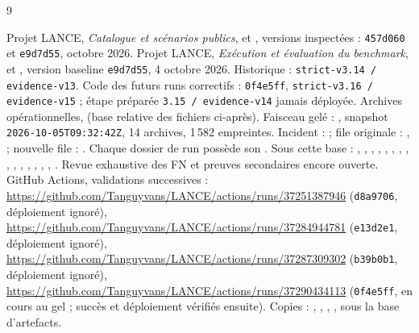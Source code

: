 \documentclass[11pt,a4paper]{article}
\newcommand{\code}[1]{{\urlstyle{tt}\nolinkurl{#1}}}
\begin{document}
{\small
\begin{thebibliography}{9}
\raggedright
\setlength{\itemsep}{1pt}
\setlength{\parskip}{0pt}
 Projet LANCE, \emph{Catalogue et scénarios publics},  et , versions inspectées : \code{457d060} et \code{e9d7d55}, octobre 2026.
 Projet LANCE, \emph{Exécution et évaluation du benchmark},  et , version baseline \code{e9d7d55}, 4 octobre 2026. Historique : \code{strict-v3.14 / evidence-v13}. Code des futurs runs correctifs : \code{0f4e5ff}, \code{strict-v3.16 / evidence-v15} ; étape préparée \code{3.15 / evidence-v14} jamais déployée.
 Archives opérationnelles,  (base relative des fichiers ci-après). Faisceau gelé : , snapshot \code{2026-10-05T09:32:42Z}, 14 archives, 1\,582 empreintes. Incident :  ; file originale : ,  ; nouvelle file : . Chaque dossier de run possède son .
 Sous cette base : , , , , , , , , , , , , , , , . Revue exhaustive des FN et preuves secondaires encore ouverte.
 GitHub Actions, validations successives : \url{https://github.com/Tanguyvans/LANCE/actions/runs/37251387946} (\code{d8a9706}, déploiement ignoré), \url{https://github.com/Tanguyvans/LANCE/actions/runs/37284944781} (\code{e13d2e1}, déploiement ignoré), \url{https://github.com/Tanguyvans/LANCE/actions/runs/37287309302} (\code{b39b0b1}, déploiement ignoré), \url{https://github.com/Tanguyvans/LANCE/actions/runs/37290434113} (\code{0f4e5ff}, en cours au gel ; succès et déploiement vérifiés ensuite). Copies : , , , , sous la base d'artefacts.

\end{thebibliography}}
\end{document}
